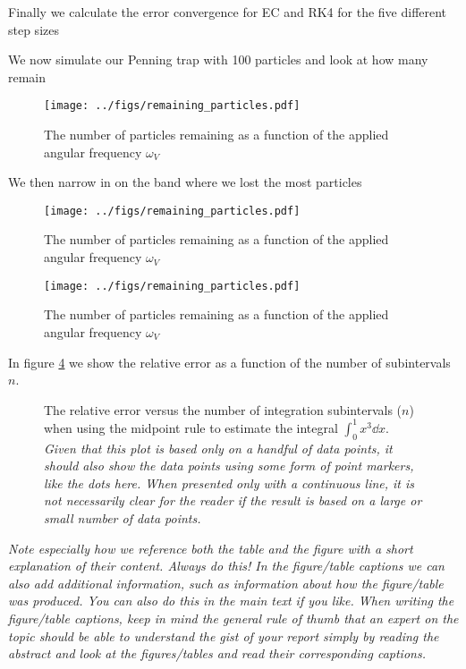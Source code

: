 \documentclass[english,notitlepage,reprint,nofootinbib]{revtex4-1}  %
\begin{document}
Finally we calculate the error convergence for EC and RK4 for the five different step sizes


We now simulate our Penning trap with 100 particles and look at how many remain

\begin{figure}[h!]
	\centering
	\texttt{[image: ../figs/remaining\_particles.pdf]} %
	\caption{The number of particles remaining as a function of the applied angular frequency $\omega_V$}
	\label{fig:part_remain}
\end{figure}

We then narrow in on the band where we lost the most particles

\begin{figure}[h!]
	\centering
	\texttt{[image: ../figs/remaining\_particles.pdf]} %
	\caption{The number of particles remaining as a function of the applied angular frequency $\omega_V$}
	\label{fig:narrow_i}
\end{figure}

\begin{figure}[h!]
	\centering
	\texttt{[image: ../figs/remaining\_particles.pdf]} %
	\caption{The number of particles remaining as a function of the applied angular frequency $\omega_V$}
	\label{fig:narrow_ni}
\end{figure}

	
	In figure \ref{fig:rel_err} we show the relative error as a function of the number of subintervals $n$.
	\begin{figure}[h!]
		\centering %
		\caption{The relative error versus the number of integration subintervals ($n$) when using the midpoint rule to estimate the integral $\int_0^1 x^3\dd x$. \textit{Given that this plot is based only on a handful of data points, it should also show the data points using some form of point markers, like the dots here. When presented only with a continuous line, it is not necessarily clear for the reader if the result is based on a large or small number of data points.}}
		\label{fig:rel_err}
	\end{figure}
	
	\textit{Note especially how we reference both the table and the figure with a short explanation of their content. Always do this! In the figure/table captions we can also add additional information, such as information about how the figure/table was produced. You can also do this in the main text if you like. When writing the figure/table captions, keep in mind the general rule of thumb that an expert on the topic should be able to understand the gist of your report simply by reading the abstract and look at the figures/tables and read their corresponding captions.}
	
\end{document}
